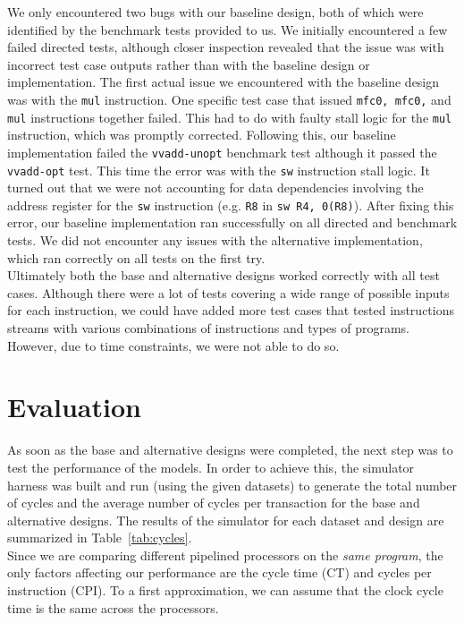 \documentclass[10pt]{article}
\begin{document}
We only encountered two bugs with our baseline design, both of which were identified by the benchmark tests provided to us. We initially encountered a few failed directed tests, although closer inspection revealed that the issue was with incorrect test case outputs rather than with the baseline design or implementation. The first actual issue we encountered with the baseline design was with the \texttt{mul} instruction. One specific test case that issued \texttt{mfc0, mfc0,} and \texttt{mul} instructions together failed. This had to do with faulty stall logic for the \texttt{mul} instruction, which was promptly corrected. Following this, our baseline implementation failed the \texttt{vvadd-unopt} benchmark test although it passed the \texttt{vvadd-opt} test. This time the error was with the \texttt{sw} instruction stall logic. It turned out that we were not accounting for data dependencies involving the address register for the \texttt{sw} instruction (e.g. \texttt{R8} in \texttt{sw R4, 0(R8)}). After fixing this error, our baseline implementation ran successfully on all directed and benchmark tests. We did not encounter any issues with the alternative implementation, which ran correctly on all tests on the first try. \\ 

Ultimately both the base and alternative designs worked correctly with all test cases. Although there were a lot of tests covering a wide range of possible inputs for each instruction, we could have added more test cases that tested instructions streams with various combinations of instructions and types of programs. However, due to time constraints, we were not able to do so. \\


\section{Evaluation}

As soon as the base and alternative designs were completed, the next step was to test the performance of the models. In order to achieve this, the simulator harness was built and run (using the given datasets) to generate the total number of cycles and the average number of cycles per transaction for the base and alternative designs. The results of the simulator for each dataset and design are summarized in Table~\ref{tab:cycles}. \\

Since we are comparing different pipelined processors on the \textit{same program}, the only factors affecting our performance are the cycle time (CT) and cycles per instruction (CPI).
To a first approximation, we can assume that the clock cycle time is the same across the processors. \\
\end{document}
